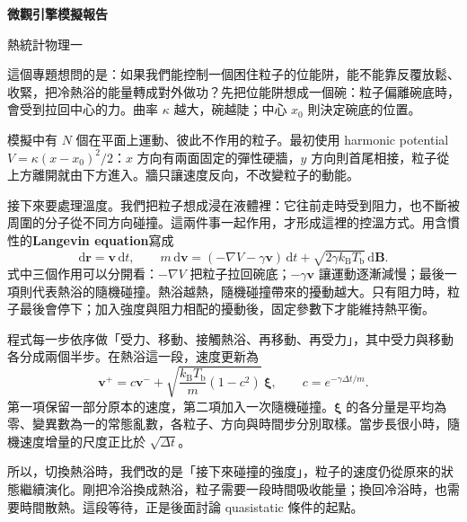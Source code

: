 \documentclass[a4paper,10pt]{article}
\newcommand{\sectiontitle}[2]{\par\addvspace{12pt}{\noindent\bfseries\fontsize{12}{16}\selectfont #1、#2\par}\nobreak\vspace{4pt}}
\begin{document}
\fontsize{11}{15.2}\selectfont
\setlength{\abovedisplayskip}{5pt}
\setlength{\belowdisplayskip}{5pt}
\setlength{\abovedisplayshortskip}{3pt}
\setlength{\belowdisplayshortskip}{4pt}
\begin{center}
{\bfseries\fontsize{16}{21}\selectfont 微觀引擎模擬報告\par}
\vspace{5pt}
熱統計物理一
\end{center}
\sectiontitle{一}{先讓粒子和熱浴交換能量}
這個專題想問的是：如果我們能控制一個困住粒子的位能阱，能不能靠反覆放鬆、收緊，把冷熱浴的能量轉成對外做功？先把位能阱想成一個碗：粒子偏離碗底時，會受到拉回中心的力。曲率 \(\kappa\) 越大，碗越陡；中心 \(x_0\) 則決定碗底的位置。

模擬中有 \(N\) 個在平面上運動、彼此不作用的粒子。最初使用 harmonic potential \(V=\kappa(x-x_0)^2/2\)：\(x\) 方向有兩面固定的彈性硬牆，\(y\) 方向則首尾相接，粒子從上方離開就由下方進入。牆只讓速度反向，不改變粒子的動能。

接下來要處理溫度。我們把粒子想成浸在液體裡：它往前走時受到阻力，也不斷被周圍的分子從不同方向碰撞。這兩件事一起作用，才形成這裡的控溫方式。用含慣性的\textbf{Langevin equation}\cite{seifert}寫成
\begin{equation}
\mathrm d\mathbf r=\mathbf v\,\mathrm dt,\qquad
m\,\mathrm d\mathbf v=(-\nabla V-\gamma\mathbf v)\,\mathrm dt
+\sqrt{2\gamma k_{\mathrm B}T_{\mathrm b}}\,\mathrm d\mathbf B.
\label{eq:langevin}
\end{equation}
式中三個作用可以分開看：\(-\nabla V\) 把粒子拉回碗底；\(-\gamma\mathbf v\) 讓運動逐漸減慢；最後一項則代表熱浴的隨機碰撞。熱浴越熱，隨機碰撞帶來的擾動越大。只有阻力時，粒子最後會停下；加入強度與阻力相配的擾動後，固定參數下才能維持熱平衡。

程式每一步依序做「受力、移動、接觸熱浴、再移動、再受力」\cite{baoab}，其中受力與移動各分成兩個半步。在熱浴這一段，速度更新為
\begin{equation}
\mathbf v^+=c\mathbf v^-+
\sqrt{\frac{k_{\mathrm B}T_{\mathrm b}}m(1-c^2)}\,\boldsymbol\xi,
\qquad c=e^{-\gamma\Delta t/m}.
\label{eq:bath}
\end{equation}
第一項保留一部分原本的速度，第二項加入一次隨機碰撞。\(\boldsymbol\xi\) 的各分量是平均為零、變異數為一的常態亂數，各粒子、方向與時間步分別取樣。當步長很小時，隨機速度增量的尺度正比於 \(\sqrt{\Delta t}\)。

所以，切換熱浴時，我們改的是「接下來碰撞的強度」，粒子的速度仍從原來的狀態繼續演化。剛把冷浴換成熱浴，粒子需要一段時間吸收能量；換回冷浴時，也需要時間散熱。這段等待，正是後面討論 quasistatic 條件的起點。
\end{document}
